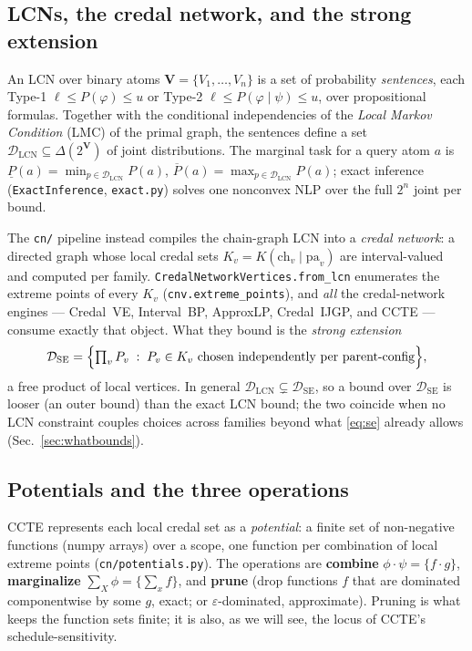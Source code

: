 \documentclass[11pt]{article}
\newcommand{\lo}{\underline}
\newcommand{\hi}{\overline}
\newcommand{\DSE}{\mathcal{D}_{\mathrm{SE}}}
\newcommand{\DLCN}{\mathcal{D}_{\mathrm{LCN}}}
\begin{document}
\subsection{LCNs, the credal network, and the strong extension}
An LCN over binary atoms $\mathbf V=\{V_1,\dots,V_n\}$ is a set of probability
\emph{sentences}, each Type-1 $\ell\le P(\varphi)\le u$ or Type-2 $\ell\le
P(\varphi\mid\psi)\le u$, over propositional formulas. Together with the conditional
independencies of the \emph{Local Markov Condition} (LMC) of the primal graph, the sentences
define a set $\DLCN\subseteq\Delta(2^{\mathbf V})$ of joint distributions. The marginal task
for a query atom $a$ is $\lo P(a)=\min_{p\in\DLCN}P(a)$, $\hi P(a)=\max_{p\in\DLCN}P(a)$;
exact inference (\texttt{ExactInference}, \texttt{exact.py}) solves one nonconvex NLP over the
full $2^n$ joint per bound.

The \texttt{cn/} pipeline instead compiles the chain-graph LCN into a \emph{credal network}:
a directed graph whose local credal sets $K_v=K(\mathrm{ch}_v\mid\mathrm{pa}_v)$ are
interval-valued and computed per family. \texttt{CredalNetworkVertices.from\_lcn} enumerates
the extreme points of every $K_v$ (\texttt{cnv.extreme\_points}), and \emph{all} the
credal-network engines --- Credal~VE, Interval~BP, ApproxLP, Credal~IJGP, and CCTE --- consume
exactly that object. What they bound is the \emph{strong extension}
\begin{equation}\label{eq:se}
  \DSE=\Bigl\{\textstyle\prod_v P_v \;:\; P_v\in K_v \text{ chosen independently per
  parent-config}\Bigr\},
\end{equation}
a free product of local vertices. In general $\DLCN\subsetneq\DSE$, so a bound over $\DSE$ is
looser (an outer bound) than the exact LCN bound; the two coincide when no LCN constraint
couples choices across families beyond what \eqref{eq:se} already allows
(Sec.~\ref{sec:whatbounds}).

\subsection{Potentials and the three operations}
CCTE represents each local credal set as a \emph{potential}: a finite set of non-negative
functions (numpy arrays) over a scope, one function per combination of local extreme points
(\texttt{cn/potentials.py}). The operations are \textbf{combine} $\phi\cdot\psi=\{f\cdot
g\}$, \textbf{marginalize} $\sum_X\phi=\{\sum_x f\}$, and \textbf{prune} (drop functions
$f$ that are dominated componentwise by some $g$, exact; or $\varepsilon$-dominated,
approximate). Pruning is what keeps the function sets finite; it is also, as we will see, the
locus of CCTE's schedule-sensitivity.
\end{document}
